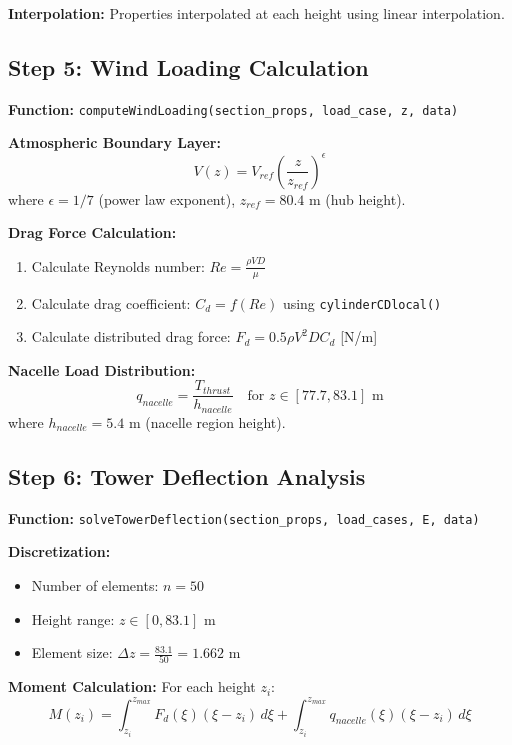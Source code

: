 \documentclass[11pt]{article}
\begin{document}
\textbf{Interpolation:} Properties interpolated at each height using linear interpolation.

\subsection{Step 5: Wind Loading Calculation}
\textbf{Function:} \texttt{computeWindLoading(section\_props, load\_case, z, data)}

\textbf{Atmospheric Boundary Layer:}
\begin{equation}
V(z) = V_{ref} \left(\frac{z}{z_{ref}}\right)^{\epsilon}
\end{equation}
where $\epsilon = 1/7$ (power law exponent), $z_{ref} = 80.4$ m (hub height).

\textbf{Drag Force Calculation:}
\begin{enumerate}
    \item Calculate Reynolds number: $Re = \frac{\rho V D}{\mu}$
    \item Calculate drag coefficient: $C_d = f(Re)$ using \texttt{cylinderCDlocal()}
    \item Calculate distributed drag force: $F_d = 0.5\rho V^2 D C_d$ [N/m]
\end{enumerate}

\textbf{Nacelle Load Distribution:}
\begin{equation}
q_{nacelle} = \frac{T_{thrust}}{h_{nacelle}} \quad \text{for } z \in [77.7, 83.1] \text{ m}
\end{equation}
where $h_{nacelle} = 5.4$ m (nacelle region height).

\subsection{Step 6: Tower Deflection Analysis}
\textbf{Function:} \texttt{solveTowerDeflection(section\_props, load\_cases, E, data)}

\textbf{Discretization:}
\begin{itemize}
    \item Number of elements: $n = 50$
    \item Height range: $z \in [0, 83.1]$ m
    \item Element size: $\Delta z = \frac{83.1}{50} = 1.662$ m
\end{itemize}

\textbf{Moment Calculation:}
For each height $z_i$:
\begin{equation}
M(z_i) = \int_{z_i}^{z_{max}} F_d(\xi)(\xi - z_i) \, d\xi + \int_{z_i}^{z_{max}} q_{nacelle}(\xi)(\xi - z_i) \, d\xi
\end{equation}
\end{document}
